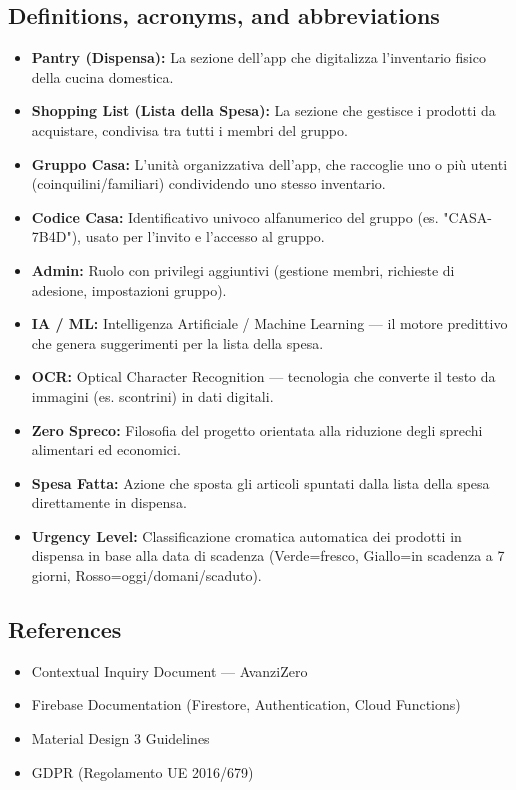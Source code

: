 \documentclass[12pt,a4paper]{article}
\begin{document}
\subsection{Definitions, acronyms, and abbreviations}
\begin{itemize}
    \item \textbf{Pantry (Dispensa):} La sezione dell'app che digitalizza l'inventario fisico della cucina domestica.
    \item \textbf{Shopping List (Lista della Spesa):} La sezione che gestisce i prodotti da acquistare, condivisa tra tutti i membri del gruppo.
    \item \textbf{Gruppo Casa:} L'unità organizzativa dell'app, che raccoglie uno o più utenti (coinquilini/familiari) condividendo uno stesso inventario.
    \item \textbf{Codice Casa:} Identificativo univoco alfanumerico del gruppo (es. "CASA-7B4D"), usato per l'invito e l'accesso al gruppo.
    \item \textbf{Admin:} Ruolo con privilegi aggiuntivi (gestione membri, richieste di adesione, impostazioni gruppo).
    \item \textbf{IA / ML:} Intelligenza Artificiale / Machine Learning — il motore predittivo che genera suggerimenti per la lista della spesa.
    \item \textbf{OCR:} Optical Character Recognition — tecnologia che converte il testo da immagini (es. scontrini) in dati digitali.
    \item \textbf{Zero Spreco:} Filosofia del progetto orientata alla riduzione degli sprechi alimentari ed economici.
    \item \textbf{Spesa Fatta:} Azione che sposta gli articoli spuntati dalla lista della spesa direttamente in dispensa.
    \item \textbf{Urgency Level:} Classificazione cromatica automatica dei prodotti in dispensa in base alla data di scadenza (Verde=fresco, Giallo=in scadenza a 7 giorni, Rosso=oggi/domani/scaduto).
\end{itemize}

\subsection{References}
\begin{itemize}
    \item Contextual Inquiry Document — AvanziZero
    \item Firebase Documentation (Firestore, Authentication, Cloud Functions)
    \item Material Design 3 Guidelines
    \item GDPR (Regolamento UE 2016/679)
\end{itemize}
\end{document}
